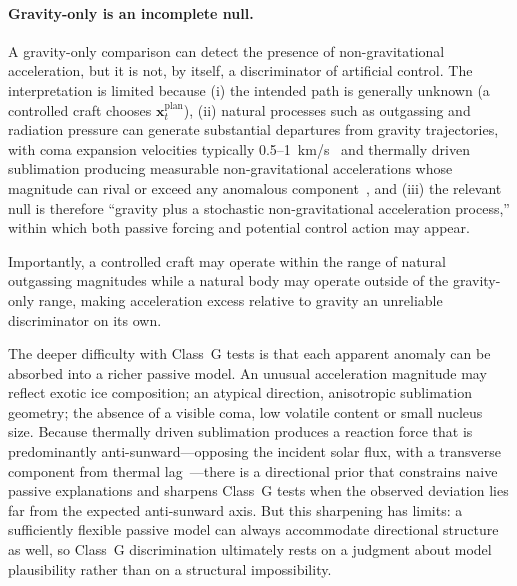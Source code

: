 \documentclass{article}
\begin{document}
\paragraph{Gravity-only is an incomplete null.}
A gravity-only comparison can detect the presence of non-gravitational acceleration, but it is not, by itself, a discriminator of artificial control. The interpretation is limited because (i) the intended path is generally unknown (a controlled craft chooses $\mathbf{x}^{\mathrm{plan}}_t$), (ii) natural processes such as outgassing and radiation pressure can generate substantial departures from gravity trajectories, with coma expansion velocities typically 0.5--1~km/s~\cite{bockelee2004borrelly,jockers2011encke} and thermally driven sublimation producing measurable non-gravitational accelerations whose magnitude can rival or exceed any anomalous component~\cite{mumma2011composition}, and (iii) the relevant null is therefore ``gravity plus a stochastic non-gravitational acceleration process,'' within which both passive forcing and potential control action may appear.

Importantly, a controlled craft may operate within the range of natural outgassing magnitudes while a natural body may operate outside of the gravity-only range, making acceleration excess relative to gravity an unreliable discriminator on its own.

The deeper difficulty with Class~G tests is that each apparent anomaly can be absorbed into a richer passive model. An unusual acceleration magnitude may reflect exotic ice composition; an atypical direction, anisotropic sublimation geometry; the absence of a visible coma, low volatile content or small nucleus size. Because thermally driven sublimation produces a reaction force that is predominantly anti-sunward---opposing the incident solar flux, with a transverse component from thermal lag~\cite{mumma2011composition}---there is a directional prior that constrains naive passive explanations and sharpens Class~G tests when the observed deviation lies far from the expected anti-sunward axis. But this sharpening has limits: a sufficiently flexible passive model can always accommodate directional structure as well, so Class~G discrimination ultimately rests on a judgment about model plausibility rather than on a structural impossibility.
\end{document}
